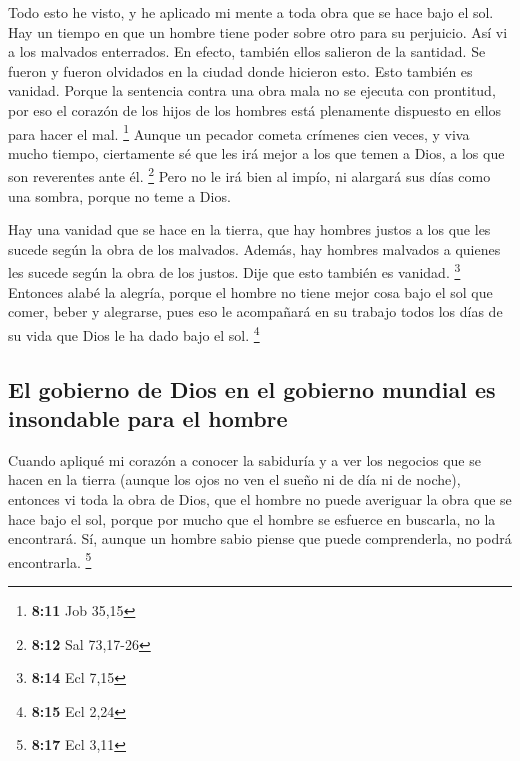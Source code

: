 \begin{paracol}{2}
 Todo esto he visto, y he aplicado mi mente a toda obra
que se hace bajo el sol. Hay un tiempo en que un hombre tiene poder
sobre otro para su perjuicio.  Así vi a los malvados
enterrados. En efecto, también ellos salieron de la santidad. Se fueron
y fueron olvidados en la ciudad donde hicieron esto. Esto también es
vanidad.  Porque la sentencia contra una obra mala no se
ejecuta con prontitud, por eso el corazón de los hijos de los hombres
está plenamente dispuesto en ellos para hacer el mal. \footnote{\textbf{8:11}
  Job 35,15}  Aunque un pecador cometa crímenes cien
veces, y viva mucho tiempo, ciertamente sé que les irá mejor a los que
temen a Dios, a los que son reverentes ante él. \footnote{\textbf{8:12}
  Sal 73,17-26}  Pero no le irá bien al impío, ni
alargará sus días como una sombra, porque no teme a Dios.

 Hay una vanidad que se hace en la tierra, que hay
hombres justos a los que les sucede según la obra de los malvados.
Además, hay hombres malvados a quienes les sucede según la obra de los
justos. Dije que esto también es vanidad. \footnote{\textbf{8:14} Ecl
  7,15}  Entonces alabé la alegría, porque el hombre no
tiene mejor cosa bajo el sol que comer, beber y alegrarse, pues eso le
acompañará en su trabajo todos los días de su vida que Dios le ha dado
bajo el sol. \footnote{\textbf{8:15} Ecl 2,24}

\hypertarget{el-gobierno-de-dios-en-el-gobierno-mundial-es-insondable-para-el-hombre}{%
\subsection{El gobierno de Dios en el gobierno mundial es insondable
para el
hombre}\label{el-gobierno-de-dios-en-el-gobierno-mundial-es-insondable-para-el-hombre}}

 Cuando apliqué mi corazón a conocer la sabiduría y a ver
los negocios que se hacen en la tierra (aunque los ojos no ven el sueño
ni de día ni de noche),  entonces vi toda la obra de
Dios, que el hombre no puede averiguar la obra que se hace bajo el sol,
porque por mucho que el hombre se esfuerce en buscarla, no la
encontrará. Sí, aunque un hombre sabio piense que puede comprenderla, no
podrá encontrarla. \footnote{\textbf{8:17} Ecl 3,11}

\switchcolumn
\begin{otherlanguage}{english}


\end{otherlanguage}
\end{paracol}
